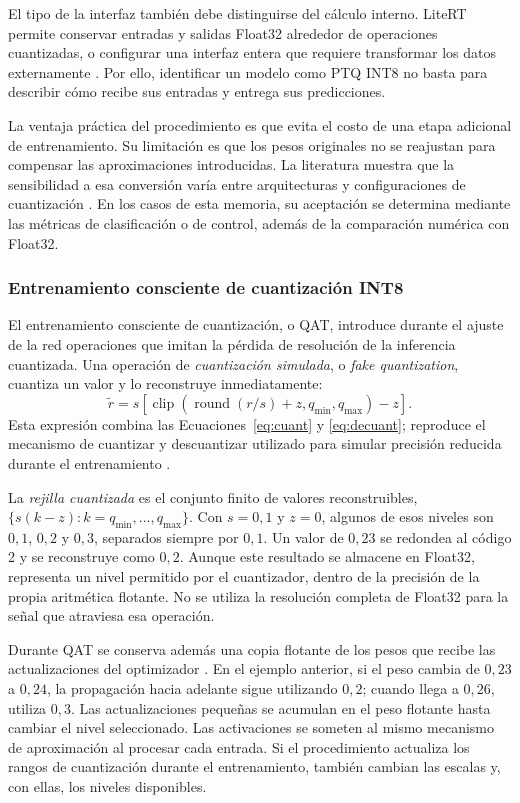 El tipo de la interfaz también debe distinguirse del cálculo interno. LiteRT permite conservar entradas y salidas Float32 alrededor de operaciones cuantizadas, o configurar una interfaz entera que requiere transformar los datos externamente \cite{litertptq}. Por ello, identificar un modelo como PTQ INT8 no basta para describir cómo recibe sus entradas y entrega sus predicciones.

La ventaja práctica del procedimiento es que evita el costo de una etapa adicional de entrenamiento. Su limitación es que los pesos originales no se reajustan para compensar las aproximaciones introducidas. La literatura muestra que la sensibilidad a esa conversión varía entre arquitecturas y configuraciones de cuantización \cite{krishnamoorthi2018}. En los casos de esta memoria, su aceptación se determina mediante las métricas de clasificación o de control, además de la comparación numérica con Float32.

\subsubsection{Entrenamiento consciente de cuantización INT8}
El entrenamiento consciente de cuantización, o QAT, introduce durante el ajuste de la red operaciones que imitan la pérdida de resolución de la inferencia cuantizada. Una operación de \emph{cuantización simulada}, o \textit{fake quantization}, cuantiza un valor y lo reconstruye inmediatamente:
\begin{equation}
\widetilde r=s\left[\operatorname{clip}\!\left(
\operatorname{round}(r/s)+z,q_{\min},q_{\max}\right)-z\right].
\label{eq:cap3_fakequant}
\end{equation}
Esta expresión combina las Ecuaciones~\ref{eq:cuant} y \ref{eq:decuant}; reproduce el mecanismo de cuantizar y descuantizar utilizado para simular precisión reducida durante el entrenamiento \cite{tffakequant}.

La \emph{rejilla cuantizada} es el conjunto finito de valores reconstruibles, $\{s(k-z):k=q_{\min},\ldots,q_{\max}\}$. Con $s=0{,}1$ y $z=0$, algunos de esos niveles son $0{,}1$, $0{,}2$ y $0{,}3$, separados siempre por $0{,}1$. Un valor de $0{,}23$ se redondea al código 2 y se reconstruye como $0{,}2$. Aunque este resultado se almacene en Float32, representa un nivel permitido por el cuantizador, dentro de la precisión de la propia aritmética flotante. No se utiliza la resolución completa de Float32 para la señal que atraviesa esa operación.

Durante QAT se conserva además una copia flotante de los pesos que recibe las actualizaciones del optimizador \cite{krishnamoorthi2018}. En el ejemplo anterior, si el peso cambia de $0{,}23$ a $0{,}24$, la propagación hacia adelante sigue utilizando $0{,}2$; cuando llega a $0{,}26$, utiliza $0{,}3$. Las actualizaciones pequeñas se acumulan en el peso flotante hasta cambiar el nivel seleccionado. Las activaciones se someten al mismo mecanismo de aproximación al procesar cada entrada. Si el procedimiento actualiza los rangos de cuantización durante el entrenamiento, también cambian las escalas y, con ellas, los niveles disponibles.

